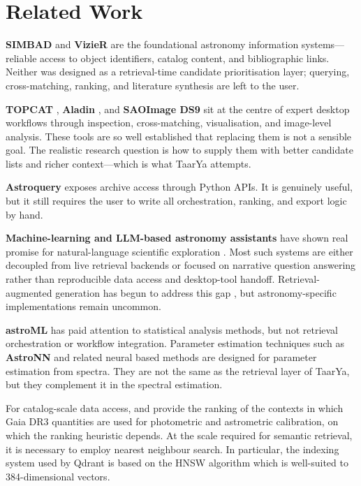 \documentclass[preprint,12pt,authoryear]{elsarticle}
\begin{document}
\section{Related Work}
\label{sec:related}

\textbf{SIMBAD} \citep{Wenger2000} and \textbf{VizieR} \citep{Ochsenbein2000} are the foundational astronomy information systems---reliable access to object identifiers, catalog content, and bibliographic links. Neither was designed as a retrieval-time candidate prioritisation layer; querying, cross-matching, ranking, and literature synthesis are left to the user.

\textbf{TOPCAT} \citep{Taylor2005}, \textbf{Aladin} \citep{Bonnarel2000}, and \textbf{SAOImage DS9} \citep{Joye2003} sit at the centre of expert desktop workflows through inspection, cross-matching, visualisation, and image-level analysis. These tools are so well established that replacing them is not a sensible goal. The realistic research question is how to supply them with better candidate lists and richer context---which is what \textsf{TaarYa} attempts.

\textbf{Astroquery} \citep{Ginsburg2019} exposes archive access through Python APIs. It is genuinely useful, but it still requires the user to write all orchestration, ranking, and export logic by hand.

\textbf{Machine-learning and LLM-based astronomy assistants} have shown real promise for natural-language scientific exploration \citep{UniverseTBD2023, Nguyen2023}. Most such systems are either decoupled from live retrieval backends or focused on narrative question answering rather than reproducible data access and desktop-tool handoff. Retrieval-augmented generation has begun to address this gap  \citep{Lewis2020}, but astronomy-specific implementations remain uncommon.

\textbf{astroML} \citep{VanderPlas2012} has paid attention to statistical analysis methods, but not retrieval orchestration or workflow integration. Parameter estimation techniques such as \textbf{AstroNN} \citep{Leung2019} and related neural based methods are designed for parameter estimation from spectra. They are not the same as the retrieval layer of \textsf{TaarYa}, but they complement it in the spectral estimation.

For catalog-scale data access, \citet{Riello2021} and \citet{Fabricius2021}  provide the ranking of the contexts in which Gaia DR3 quantities are used for photometric and astrometric calibration, on which the ranking heuristic depends. At the scale required for semantic retrieval, it is necessary to employ nearest neighbour search. In particular, the indexing system used by Qdrant is based on the HNSW algorithm \citep{Malkov2020} which is well-suited to 384-dimensional vectors.
\end{document}
